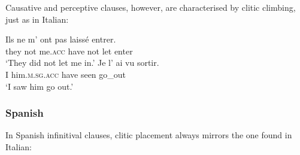 \documentclass[output=paper,modfonts,nonflat,newtxmath]{langsci/langscibook}
\begin{document}
Causative and perceptive clauses, however, are characterised by clitic climbing, just as in Italian:

\ea \label{ex:sciutti:20}
    \gll Ils ne m’ ont pas laissé entrer.\\
         they not me.\textsc{acc} have not let enter \\
    \glt  ‘They did not let me in.’
\ex \label{ex:sciutti:21}
    \gll Je l’ ai vu sortir.\\
         I him.\textsc{m.sg.acc} have seen go\_out \\
    \glt  ‘I saw him go out.’
\z

\subsubsection{Spanish} %

In Spanish infinitival clauses, clitic placement always mirrors the one found in Italian:%
\end{document}
